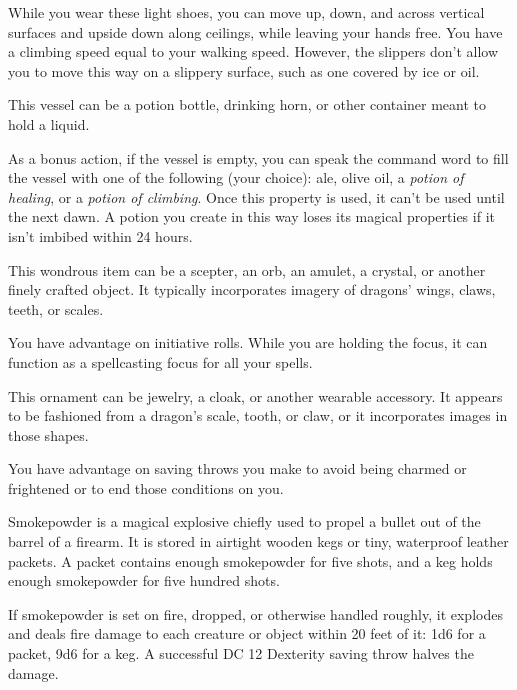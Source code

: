 \documentclass[10pt,a4paper,twoside,bg=print,twocolumn,openany,nodeprecatedcode]{dndbook}
\begin{document}
While you wear these light shoes, you can move up, down, and across vertical surfaces and upside down along ceilings, while leaving your hands free. You have a climbing speed equal to your walking speed. However, the slippers don't allow you to move this way on a slippery surface, such as one covered by ice or oil.

This vessel can be a potion bottle, drinking horn, or other container meant to hold a liquid.

As a bonus action, if the vessel is empty, you can speak the command word to fill the vessel with one of the following (your choice): ale, olive oil, a \textit{potion of healing}, or a \textit{potion of climbing}. Once this property is used, it can't be used until the next dawn. A potion you create in this way loses its magical properties if it isn't imbibed within 24 hours.

This wondrous item can be a scepter, an orb, an amulet, a crystal, or another finely crafted object. It typically incorporates imagery of dragons' wings, claws, teeth, or scales.

You have advantage on initiative rolls. While you are holding the focus, it can function as a spellcasting focus for all your spells.

This ornament can be jewelry, a cloak, or another wearable accessory. It appears to be fashioned from a dragon's scale, tooth, or claw, or it incorporates images in those shapes.

You have advantage on saving throws you make to avoid being charmed or frightened or to end those conditions on you.

Smokepowder is a magical explosive chiefly used to propel a bullet out of the barrel of a firearm. It is stored in airtight wooden kegs or tiny, waterproof leather packets. A packet contains enough smokepowder for five shots, and a keg holds enough smokepowder for five hundred shots.

If smokepowder is set on fire, dropped, or otherwise handled roughly, it explodes and deals fire damage to each creature or object within 20 feet of it: 1d6 for a packet, 9d6 for a keg. A successful DC 12 Dexterity saving throw halves the damage.
\end{document}
